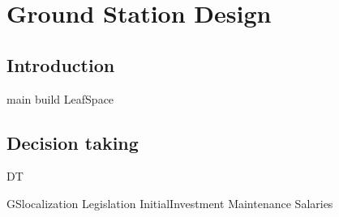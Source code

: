 \chapter{Ground Station Design}
\newpage
\section{Introduction}
{main}
{build}
{LeafSpace}
\section{Decision taking}
{DT}

{GSlocalization}
{Legislation}
{InitialInvestment}
{Maintenance}
{Salaries}
%
%
